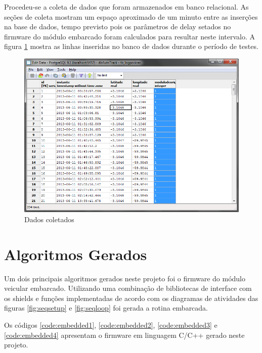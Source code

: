 Procedeu-se a coleta de dados que foram armazenados em banco relacional. As seções de coleta mostram um espaço aproximado de um minuto entre as inserções na base de dados, tempo previsto pois os parâmetros de delay setados no firmware do módulo embarcado foram calculados para resultar neste intervalo. A figura \ref{fig:dadoscoletados} mostra as linhas inseridas no banco de dados durante o período de testes.

\begin{figure}[!htb]
	\centering
	\includegraphics[width=\textwidth]{figures/dados_coletados.png}
	\caption{Dados coletados}
	\label{fig:dadoscoletados}
\end{figure}

\section{Algoritmos Gerados}

Um dois principais algoritmos gerados neste projeto foi o firmware do módulo veicular embarcado. Utilizando uma combinação de bibliotecas de interface com os shields e funções implementadas de acordo com os diagramas de atividades das figuras \ref{fig:seqsetup} e \ref{fig:seqloop} foi gerada a rotina embarcada.

Os códigos \ref{code:embedded1}, \ref{code:embedded2}, \ref{code:embedded3} e \ref{code:embedded4} apresentam o firmware em linguagem C/C++ gerado neste projeto.  

\renewcommand{\baselinestretch}{0.5}  %
\begin{codigo}[htb]
\fontsize{9pt}{9pt}\selectfont
      \begin{boxit}  %
      \vspace{2mm}
   \end{boxit}
   \caption{\it Código do Módulo Embarcado Parte 1}
   \label{code:embedded1}
\end{codigo}

